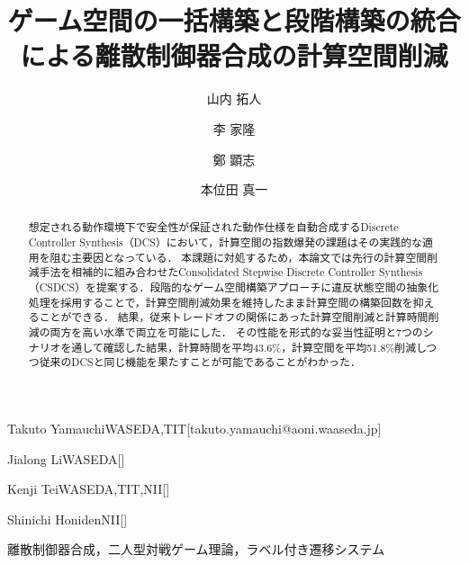 \documentclass[submit]{ipsj}
\begin{document}
\title{ゲーム空間の一括構築と段階構築の統合による離散制御器合成の計算空間削減}



\author{山内 拓人}{Takuto Yamauchi}{WASEDA,TIT}[takuto.yamauchi@aoni.waaseda.jp]
\author{李 家隆}{Jialong Li}{WASEDA}[]
\author{鄭 顕志}{Kenji Tei}{WASEDA,TIT,NII}[]
\author{本位田 真一}{Shinichi Honiden}{NII}[]

\begin{abstract}
想定される動作環境下で安全性が保証された動作仕様を自動合成するDiscrete Controller Synthesis（DCS）において，計算空間の指数爆発の課題はその実践的な適用を阻む主要因となっている．
本課題に対処するため，本論文では先行の計算空間削減手法を相補的に組み合わせたConsolidated Stepwise Discrete Controller Synthesis（CSDCS）を提案する．段階的なゲーム空間構築アプローチに違反状態空間の抽象化処理を採用することで，計算空間削減効果を維持したまま計算空間の構築回数を抑えることができる．
結果，従来トレードオフの関係にあった計算空間削減と計算時間削減の両方を高い水準で両立を可能にした．
その性能を形式的な妥当性証明と7つのシナリオを通して確認した結果，計算時間を平均43.6\%，計算空間を平均51.8\%削減しつつ従来のDCSと同じ機能を果たすことが可能であることがわかった．
\end{abstract}
\begin{jkeyword}
離散制御器合成，二人型対戦ゲーム理論，ラベル付き遷移システム
\end{jkeyword}
\end{document}
